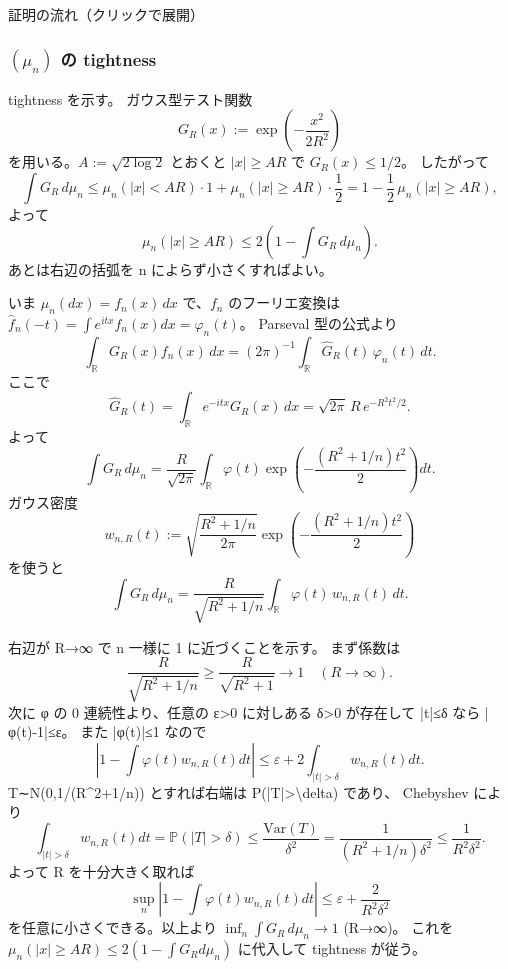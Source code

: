 \documentclass[uplatex,dvipdfmx,11pt,a4paper,openany]{bxjsbook}
\begin{document}
\begin{detailblock}{証明の流れ（クリックで展開）}
\subsubsection{$(\mu_n)$ の tightness}
tightness を示す。
            ガウス型テスト関数
            \[G_R(x):=\exp\!\left(-\frac{x^2}{2R^2}\right)\]
            を用いる。$A:=\sqrt{2\log 2}$ とおくと $|x|\ge AR$ で $G_R(x)\le 1/2$。
            したがって
            \[\int G_R\,d\mu_n
              \le \mu_n(|x|<AR)\cdot 1+\mu_n(|x|\ge AR)\cdot\frac12
              =1-\frac12\,\mu_n(|x|\ge AR),\]
            よって
            \[\mu_n(|x|\ge AR)\le 2\left(1-\int G_R\,d\mu_n\right).\]
            あとは右辺の括弧を n によらず小さくすればよい。

いま $\mu_n(dx)=f_n(x)\,dx$ で、$f_n$ のフーリエ変換は
            $\widehat f_n(-t)=\int e^{itx}f_n(x)dx=\varphi_n(t)$。
            Parseval 型の公式より
            \[\int_{\mathbb R} G_R(x)f_n(x)\,dx
              =(2\pi)^{-1}\int_{\mathbb R} \widehat G_R(t)\,\varphi_n(t)\,dt.\]
            ここで
            \[\widehat G_R(t)=\int_{\mathbb R}e^{-itx}G_R(x)\,dx
              =\sqrt{2\pi}\,R\,e^{-R^2t^2/2}.\]
            よって
            \[\int G_R\,d\mu_n
              =\frac{R}{\sqrt{2\pi}}\int_{\mathbb R}\varphi(t)\exp\!\left(-\frac{(R^2+1/n)t^2}{2}\right)dt.\]
            ガウス密度
            \[w_{n,R}(t):=\sqrt{\frac{R^2+1/n}{2\pi}}\exp\!\left(-\frac{(R^2+1/n)t^2}{2}\right)\]
            を使うと
            \[\int G_R\,d\mu_n
              =\frac{R}{\sqrt{R^2+1/n}}\int_{\mathbb R}\varphi(t)\,w_{n,R}(t)\,dt.\]

右辺が R→∞ で n 一様に 1 に近づくことを示す。
            まず係数は
            \[\frac{R}{\sqrt{R^2+1/n}} \ge \frac{R}{\sqrt{R^2+1}}\to 1 \quad(R\to\infty).\]
            次に φ の 0 連続性より、任意の ε>0 に対しある δ>0 が存在して
            |t|≤δ なら |φ(t)-1|≤ε。
            また |φ(t)|≤1 なので
            \[\left|1-\int \varphi(t)w_{n,R}(t)dt\right|
              \le \varepsilon +2\int_{|t|>\delta} w_{n,R}(t)dt.\]
            T∼N(0,1/(R\textasciicircum{}2+1/n)) とすれば右端は P(|T|>\textbackslash{}delta) であり、
            Chebyshev により
            \[\int_{|t|>\delta} w_{n,R}(t)dt
              =\mathbb P(|T|>\delta)
              \le \frac{\mathrm{Var}(T)}{\delta^2}
              =\frac{1}{(R^2+1/n)\delta^2}
              \le \frac{1}{R^2\delta^2}.\]
            よって R を十分大きく取れば
            \[\sup_n\left|1-\int \varphi(t)w_{n,R}(t)dt\right|
              \le \varepsilon + \frac{2}{R^2\delta^2}\]
            を任意に小さくできる。以上より
            $\inf_n \int G_R\,d\mu_n \to 1$ (R→∞)。
            これを
            $\mu_n(|x|\ge AR)\le 2(1-\int G_R d\mu_n)$
            に代入して tightness が従う。


\end{detailblock}
\end{document}
